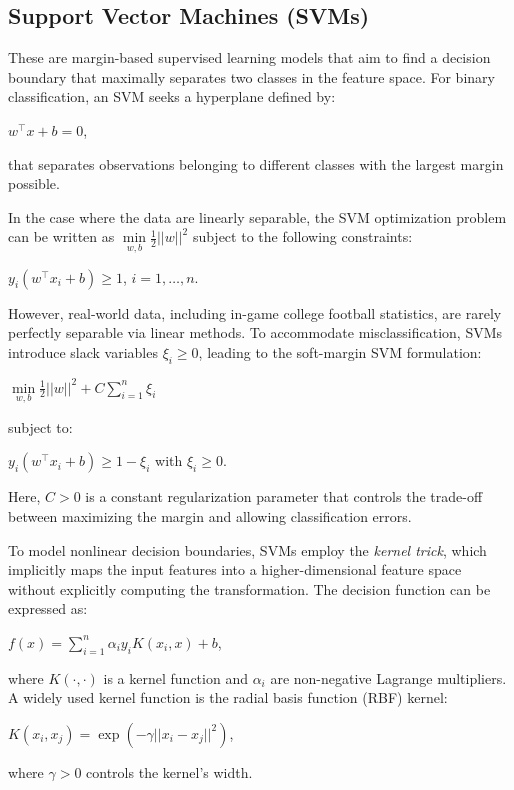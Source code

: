 \documentclass[11pt]{amsart}
\theoremstyle{definition}                  %
\theoremstyle{remark}                       %
\numberwithin{equation}{section}
\begin{document}
\subsection{Support Vector Machines (SVMs)}
These are margin-based supervised learning models that aim to find a decision boundary that maximally separates two classes in the feature space. For binary classification, an SVM seeks a hyperplane defined by:
\begin{center}
    $w^\intercal x + b = 0$,
\end{center}
that separates observations belonging to different classes with the largest margin possible.

In the case where the data are linearly separable, the SVM optimization problem can be written as $\min\limits_{w, b}\frac{1}{2}||w||^2$ subject to the following constraints:
\begin{center}
    $y_i(w^\intercal x_i + b) \geq 1$, $i = 1, \dots, n$.
\end{center}
However, real-world data, including in-game college football statistics, are rarely perfectly separable via linear methods. To accommodate misclassification, SVMs introduce slack variables $\xi_i \geq 0$, leading to the soft-margin SVM formulation:
\begin{center}
    $\min\limits_{w, b}\frac{1}{2}||w||^2 + C\sum\limits_{i=1}^n\xi_i$
\end{center}
subject to:
\begin{center}
    $y_i(w^\intercal x_i + b) \geq 1 - \xi_i$ with $\xi_i \geq 0$.
\end{center}
Here, $C > 0$ is a constant regularization parameter that controls the trade-off between maximizing the margin and allowing classification errors.

To model nonlinear decision boundaries, SVMs employ the \textit{kernel trick}, which implicitly maps the input features into a higher-dimensional feature space without explicitly computing the transformation. The decision function can be expressed as:
\begin{center}
    $f(x) = \sum\limits_{i=1}^n\alpha_iy_iK(x_i, x) + b$,
\end{center}
where $K(\cdot, \cdot)$ is a kernel function and $\alpha_i$ are non-negative Lagrange multipliers.
A widely used kernel function is the radial basis function (RBF) kernel:
\begin{center}
    $K(x_i, x_j) = \exp(-\gamma||x_i - x_j||^2)$,
\end{center}
where $\gamma > 0$ controls the kernel's width.
\end{document}
